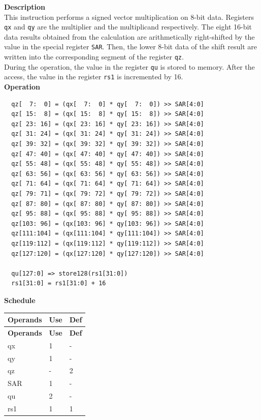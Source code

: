 \textbf{Description}\\
This instruction performs a signed vector multiplication on 8-bit data. Registers \lstinline{qx} and \lstinline{qy} are the multiplier and the multiplicand respectively. The eight 16-bit data results obtained from the calculation are arithmetically right-shifted by the value in the special register \lstinline{SAR}. Then, the lower 8-bit data of the shift result are written into the corresponding segment of the register \lstinline{qz}.\\
During the operation, the value in the register \lstinline{qu} is stored to memory. After the access, the value in the register \lstinline{rs1} is incremented by 16.\\
\textbf{Operation}
\begin{lstlisting}
  qz[  7:  0] = (qx[  7:  0] * qy[  7:  0]) >> SAR[4:0]
  qz[ 15:  8] = (qx[ 15:  8] * qy[ 15:  8]) >> SAR[4:0]
  qz[ 23: 16] = (qx[ 23: 16] * qy[ 23: 16]) >> SAR[4:0]
  qz[ 31: 24] = (qx[ 31: 24] * qy[ 31: 24]) >> SAR[4:0]
  qz[ 39: 32] = (qx[ 39: 32] * qy[ 39: 32]) >> SAR[4:0]
  qz[ 47: 40] = (qx[ 47: 40] * qy[ 47: 40]) >> SAR[4:0]
  qz[ 55: 48] = (qx[ 55: 48] * qy[ 55: 48]) >> SAR[4:0]
  qz[ 63: 56] = (qx[ 63: 56] * qy[ 63: 56]) >> SAR[4:0]
  qz[ 71: 64] = (qx[ 71: 64] * qy[ 71: 64]) >> SAR[4:0]
  qz[ 79: 71] = (qx[ 79: 72] * qy[ 79: 72]) >> SAR[4:0]
  qz[ 87: 80] = (qx[ 87: 80] * qy[ 87: 80]) >> SAR[4:0]
  qz[ 95: 88] = (qx[ 95: 88] * qy[ 95: 88]) >> SAR[4:0]
  qz[103: 96] = (qx[103: 96] * qy[103: 96]) >> SAR[4:0]
  qz[111:104] = (qx[111:104] * qy[111:104]) >> SAR[4:0]
  qz[119:112] = (qx[119:112] * qy[119:112]) >> SAR[4:0]
  qz[127:120] = (qx[127:120] * qy[127:120]) >> SAR[4:0]

  qu[127:0] => store128(rs1[31:0])
  rs1[31:0] = rs1[31:0] + 16
\end{lstlisting}


\textbf{Schedule}\\
\begin{longtable}[c]{|l|l|l|}
    \hline
    \rowcolor{lightgray}
    \textbf{Operands} & \textbf{Use} & \textbf{Def} \\\hline
    \endfirsthead
    \hline
    \rowcolor{lightgray}
     \textbf{Operands} & \textbf{Use} & \textbf{Def} \\\hline
    \endhead
    \hline
    \endfoot

    qx & 1 & - \\\hline
  qy & 1 & - \\\hline
     qz & - & 2 \\\hline
    SAR & 1 & - \\\hline
    qu & 2 & - \\\hline
    rs1 & 1 & 1

\end{longtable}

